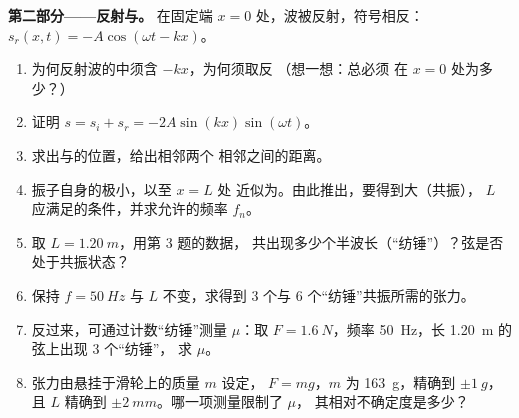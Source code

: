 \begin{problem}
\medskip
\noindent\textbf{第二部分——反射与。}
在固定端 $x = 0$ 处，波被反射，符号相反：
$s_r(x, t) = -A\cos(\omega t - kx)$。
\begin{enumerate}[resume]
  \item 为何反射波的中须含 $-kx$，为何须取反
        （想一想：总必须
        在 $x = 0$ 处为多少？）
  \item 证明 $s = s_i + s_r = -2A\sin(kx)\sin(\omega t)$。
  \item 求出与的位置，给出相邻两个
        相邻之间的距离。
  \item 振子自身的极小，以至 $x = L$ 处
        近似为。由此推出，要得到大（共振），
        $L$ 应满足的条件，并求允许的频率 $f_n$。
  \item 取 $L = \qty{1.20}{m}$，用第 3 题的数据，
        共出现多少个半波长（“纺锤”）？弦是否
        处于共振状态？
  \item 保持 $f = \qty{50}{Hz}$ 与 $L$ 不变，求得到
        $3$ 个与 $6$ 个“纺锤”共振所需的张力。
  \item 反过来，可通过计数“纺锤”测量 $\mu$：取
        $F = \qty{1.6}{N}$，频率 \qty{50}{Hz}，长 \qty{1.20}{m} 的弦上出现 $3$ 个“纺锤”，
        求 $\mu$。
  \item 张力由悬挂于滑轮上的质量 $m$ 设定，
        $F = mg$，$m$ 为 \qty{163}{g}，精确到 $\pm\qty{1}{g}$，且
        $L$ 精确到 $\pm\qty{2}{mm}$。哪一项测量限制了 $\mu$，
        其相对不确定度是多少？
\end{enumerate}


\end{problem}
